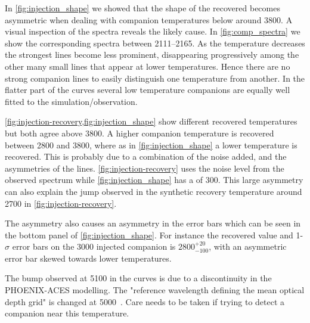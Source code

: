 In \cref{fig:injection_shape} we showed that the shape of the recovered \textchisquared{} becomes asymmetric when dealing with companion temperatures below around 3800\K{}.
A visual inspection of the spectra reveals the likely cause.
In \cref{fig:comp_spectra} we show the corresponding spectra between 2111--2165\nm{}.
As the temperature decreases the strongest lines become less prominent, disappearing progressively among the other many small lines that appear at lower temperatures.
Hence there are no strong companion lines to easily distinguish one temperature from another.
In the flatter part of the \textchisquared{} curves several low temperature companions are equally well fitted to the simulation/observation.

\cref{fig:injection-recovery,fig:injection_shape} show different recovered temperatures but both agree above 3800\K{}.
A higher companion temperature is recovered between 2800 and 3800\K{}, where as in \cref{fig:injection_shape} a lower temperature is recovered.
This is probably due to a combination of the noise added, and the asymmetries of the \textchisquared{} lines.
\cref{fig:injection-recovery} uses the noise level from the observed spectrum while \cref{fig:injection_shape} has a \snr{} of 300.
This large asymmetry can also explain the jump observed in the synthetic recovery temperature around 2700\K{} in \cref{fig:injection-recovery}.

The asymmetry also causes an asymmetry in the \textchisquared{} error bars which can be seen in the bottom panel of \cref{fig:injection_shape}.
For instance the recovered value and 1-\(\sigma\) error bars on the 3000\K{} injected companion is \(2800 ^{+20}_{-100}\), with an asymmetric error bar skewed towards lower temperatures.

The bump observed at 5100\K{} in the \textchisquared{} curves is due to a discontinuity in the {PHOENIX-ACES} modelling.
The "reference wavelength defining the mean optical depth grid" is changed at 5000\K{}~\citep[][Sect. 2.3]{husser_new_2013}.
Care needs to be taken if trying to detect a companion near this temperature.

